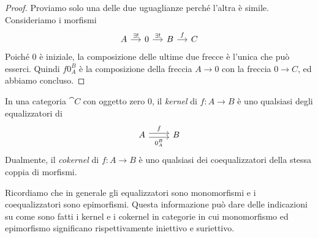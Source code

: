 \begin{proof}
  Proviamo solo una delle due uguaglianze perché l'altra è
  simile. Consideriamo i morfismi
  \[
    \begin{tikzcd}[column sep=small]
      A \ar["{\exists!}", r] & 0 \ar["{\exists!}", r] & B \ar["f", r] & C
    \end{tikzcd}
  \]
  Poiché \(0\) è iniziale, la composizione delle ultime due frecce è
  l'unica che può esserci. Quindi \(f 0_A^B\) è la composizione della
  freccia \(A \to 0\) con la freccia \(0 \to C\), ed abbiamo concluso.
\end{proof}

\begin{definition}
  In una categoria \(\cat C\) con oggetto zero \(0\), il {\em kernel} di
  \(f : A \to B\) è uno qualsiasi degli equalizzatori di
  \[
    \begin{tikzcd}
      A \ar["f", shift left, r] \ar["{0_A^B}", shift right, swap, r] & B
    \end{tikzcd}
  \]
  Dualmente, il {\em cokernel} di \(f : A \to B\) è uno qualsiasi dei
  coequalizzatori della stessa coppia di morfismi.
\end{definition}

\begin{remark}
  Ricordiamo che in generale gli equalizzatori sono monomorfismi e i
  coequalizzatori sono epimorfismi. Questa informazione può dare delle
  indicazioni su come sono fatti i kernel e i cokernel in categorie in
  cui monomorfismo ed epimorfismo significano rispettivamente iniettivo
  e suriettivo.
\end{remark}

